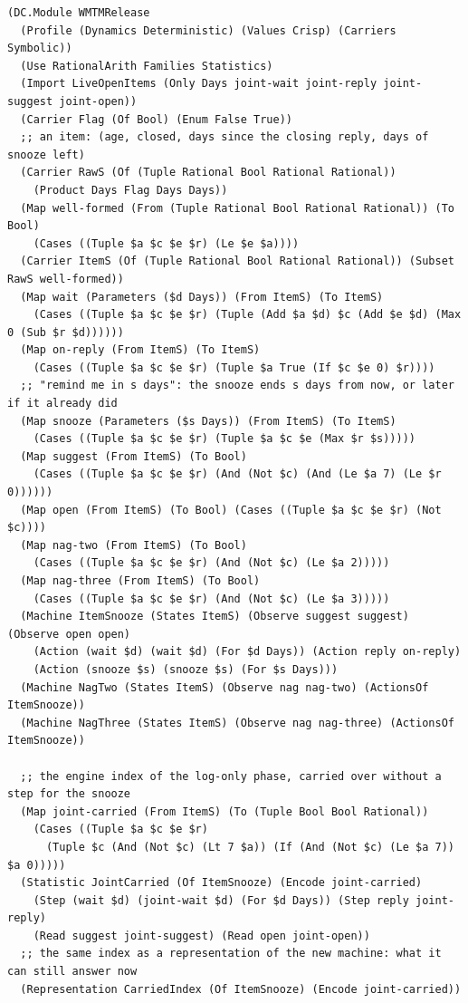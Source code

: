 \documentclass[11pt]{article}
\theoremstyle{definition}
\theoremstyle{plain}
\begin{document}
\begin{lstlisting}[style=mettamod]
(DC.Module WMTMRelease
  (Profile (Dynamics Deterministic) (Values Crisp) (Carriers Symbolic))
  (Use RationalArith Families Statistics)
  (Import LiveOpenItems (Only Days joint-wait joint-reply joint-suggest joint-open))
  (Carrier Flag (Of Bool) (Enum False True))
  ;; an item: (age, closed, days since the closing reply, days of snooze left)
  (Carrier RawS (Of (Tuple Rational Bool Rational Rational))
    (Product Days Flag Days Days))
  (Map well-formed (From (Tuple Rational Bool Rational Rational)) (To Bool)
    (Cases ((Tuple $a $c $e $r) (Le $e $a))))
  (Carrier ItemS (Of (Tuple Rational Bool Rational Rational)) (Subset RawS well-formed))
  (Map wait (Parameters ($d Days)) (From ItemS) (To ItemS)
    (Cases ((Tuple $a $c $e $r) (Tuple (Add $a $d) $c (Add $e $d) (Max 0 (Sub $r $d))))))
  (Map on-reply (From ItemS) (To ItemS)
    (Cases ((Tuple $a $c $e $r) (Tuple $a True (If $c $e 0) $r))))
  ;; "remind me in s days": the snooze ends s days from now, or later if it already did
  (Map snooze (Parameters ($s Days)) (From ItemS) (To ItemS)
    (Cases ((Tuple $a $c $e $r) (Tuple $a $c $e (Max $r $s)))))
  (Map suggest (From ItemS) (To Bool)
    (Cases ((Tuple $a $c $e $r) (And (Not $c) (And (Le $a 7) (Le $r 0))))))
  (Map open (From ItemS) (To Bool) (Cases ((Tuple $a $c $e $r) (Not $c))))
  (Map nag-two (From ItemS) (To Bool)
    (Cases ((Tuple $a $c $e $r) (And (Not $c) (Le $a 2)))))
  (Map nag-three (From ItemS) (To Bool)
    (Cases ((Tuple $a $c $e $r) (And (Not $c) (Le $a 3)))))
  (Machine ItemSnooze (States ItemS) (Observe suggest suggest) (Observe open open)
    (Action (wait $d) (wait $d) (For $d Days)) (Action reply on-reply)
    (Action (snooze $s) (snooze $s) (For $s Days)))
  (Machine NagTwo (States ItemS) (Observe nag nag-two) (ActionsOf ItemSnooze))
  (Machine NagThree (States ItemS) (Observe nag nag-three) (ActionsOf ItemSnooze))

  ;; the engine index of the log-only phase, carried over without a step for the snooze
  (Map joint-carried (From ItemS) (To (Tuple Bool Bool Rational))
    (Cases ((Tuple $a $c $e $r)
      (Tuple $c (And (Not $c) (Lt 7 $a)) (If (And (Not $c) (Le $a 7)) $a 0)))))
  (Statistic JointCarried (Of ItemSnooze) (Encode joint-carried)
    (Step (wait $d) (joint-wait $d) (For $d Days)) (Step reply joint-reply)
    (Read suggest joint-suggest) (Read open joint-open))
  ;; the same index as a representation of the new machine: what it can still answer now
  (Representation CarriedIndex (Of ItemSnooze) (Encode joint-carried))
\end{lstlisting}
\end{document}
